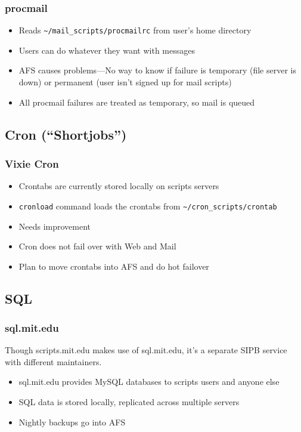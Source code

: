 \begin{frame}[fragile]
  \frametitle{procmail}
  \begin{itemize}
    \item Reads \verb|~/mail_scripts/procmailrc| from user's home directory
    \item Users can do whatever they want with messages
    \item AFS causes problems---No way to know if failure is temporary (file server is down) or permanent (user isn't signed up for mail scripts)
    \item All procmail failures are treated as temporary, so mail is queued
  \end{itemize}
\end{frame}

\subsection{Cron (``Shortjobs'')}

\begin{frame}[fragile]
  \frametitle{Vixie Cron}
  \begin{itemize}
    \item Crontabs are currently stored locally on scripts servers
    \item {\tt cronload} command loads the crontabs from
      \verb|~/cron_scripts/crontab| \pause
    \item Needs improvement
    \item Cron does not fail over with Web and Mail
    \item Plan to move crontabs into AFS and do hot failover
  \end{itemize}
\end{frame}

\subsection{SQL}

\begin{frame}
  \frametitle{sql.mit.edu}
  Though scripts.mit.edu makes use of sql.mit.edu, it's a separate SIPB service with different maintainers.
\begin{itemize}
\item sql.mit.edu provides MySQL databases to scripts users and anyone else
\item SQL data is stored locally, replicated across multiple servers
\item Nightly backups go into AFS
\end{itemize}
\end{frame}
